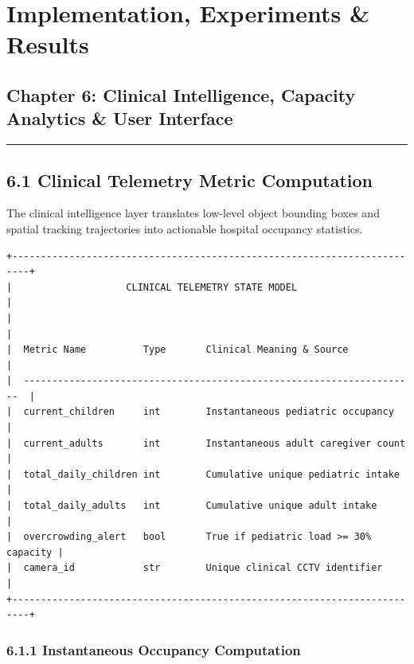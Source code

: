 \chapter{Implementation, Experiments \&
Results}\label{implementation-experiments-results}

\section{Chapter 6: Clinical Intelligence, Capacity Analytics \& User
Interface}\label{chapter-6-clinical-intelligence-capacity-analytics-user-interface}

\begin{center}\rule{0.5\linewidth}{0.5pt}\end{center}

\section{6.1 Clinical Telemetry Metric
Computation}\label{clinical-telemetry-metric-computation}

The clinical intelligence layer translates low-level object bounding
boxes and spatial tracking trajectories into actionable hospital
occupancy statistics.

\begin{verbatim}
+-------------------------------------------------------------------------+
|                    CLINICAL TELEMETRY STATE MODEL                       |
|                                                                         |
|  Metric Name          Type       Clinical Meaning & Source              |
|  ---------------------------------------------------------------------  |
|  current_children     int        Instantaneous pediatric occupancy      |
|  current_adults       int        Instantaneous adult caregiver count    |
|  total_daily_children int        Cumulative unique pediatric intake     |
|  total_daily_adults   int        Cumulative unique adult intake         |
|  overcrowding_alert   bool       True if pediatric load >= 30% capacity |
|  camera_id            str        Unique clinical CCTV identifier        |
+-------------------------------------------------------------------------+
\end{verbatim}

\subsection{6.1.1 Instantaneous Occupancy
Computation}\label{instantaneous-occupancy-computation}

